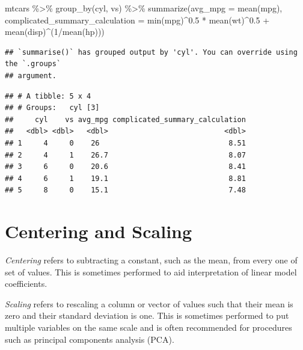 \documentclass[
]{book}
\newenvironment{Shaded}{\begin{snugshade}}{\end{snugshade}}
\newcommand{\AttributeTok}[1]{\textcolor[rgb]{0.77,0.63,0.00}{#1}}
\newcommand{\DecValTok}[1]{\textcolor[rgb]{0.00,0.00,0.81}{#1}}
\newcommand{\FloatTok}[1]{\textcolor[rgb]{0.00,0.00,0.81}{#1}}
\newcommand{\FunctionTok}[1]{\textcolor[rgb]{0.00,0.00,0.00}{#1}}
\newcommand{\NormalTok}[1]{#1}
\newcommand{\SpecialCharTok}[1]{\textcolor[rgb]{0.00,0.00,0.00}{#1}}
\begin{document}
\begin{Shaded}
\begin{Highlighting}[]
\NormalTok{mtcars }\SpecialCharTok{\%\textgreater{}\%} 
  \FunctionTok{group\_by}\NormalTok{(cyl, vs) }\SpecialCharTok{\%\textgreater{}\%} 
  \FunctionTok{summarize}\NormalTok{(}\AttributeTok{avg\_mpg =} \FunctionTok{mean}\NormalTok{(mpg),}
            \AttributeTok{complicated\_summary\_calculation =} 
              \FunctionTok{min}\NormalTok{(mpg)}\SpecialCharTok{\^{}}\FloatTok{0.5} \SpecialCharTok{*} 
              \FunctionTok{mean}\NormalTok{(wt)}\SpecialCharTok{\^{}}\FloatTok{0.5} \SpecialCharTok{+} 
              \FunctionTok{mean}\NormalTok{(disp)}\SpecialCharTok{\^{}}\NormalTok{(}\DecValTok{1}\SpecialCharTok{/}\FunctionTok{mean}\NormalTok{(hp)))}
\end{Highlighting}
\end{Shaded}

\begin{verbatim}
## `summarise()` has grouped output by 'cyl'. You can override using the `.groups`
## argument.
\end{verbatim}

\begin{verbatim}
## # A tibble: 5 x 4
## # Groups:   cyl [3]
##     cyl    vs avg_mpg complicated_summary_calculation
##   <dbl> <dbl>   <dbl>                           <dbl>
## 1     4     0    26                              8.51
## 2     4     1    26.7                            8.07
## 3     6     0    20.6                            8.41
## 4     6     1    19.1                            8.81
## 5     8     0    15.1                            7.48
\end{verbatim}

\hypertarget{centering-and-scaling}{%
\section{Centering and Scaling}\label{centering-and-scaling}}

\emph{Centering} refers to subtracting a constant, such as the mean, from every one of set of values. This is sometimes performed to aid interpretation of linear model coefficients.

\emph{Scaling} refers to rescaling a column or vector of values such that their mean is zero and their standard deviation is one. This is sometimes performed to put multiple variables on the same scale and is often recommended for procedures such as principal components analysis (PCA).
\end{document}
